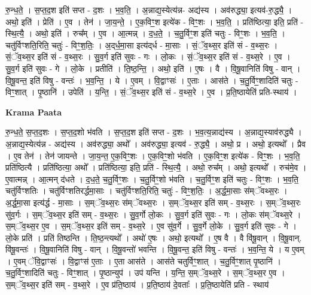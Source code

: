 \documentclass[17pt]{extarticle}
\begin{document}
रु॒न्ध॒ते॒ । स॒प्त॒द॒श इति॑ सप्त - द॒शः । भ॒व॒ति॒ । अ॒न्नाद्य॒स्येत्य॑न्न- अद्य॑स्य । अव॑रुद्ध्या॒ इत्यव॑-रु॒द्ध्यै॒ । अथो॒ इति॑ । प्रेति॑ । ए॒व । तेन॑ । जा॒य॒न्ते॒ । ए॒क॒विꣳ॒॒श इत्ये॑क - विꣳ॒॒शः । भ॒व॒ति॒ । प्रति॑ष्ठित्या॒ इति॒ प्रति॑ - स्थि॒त्यै॒ । अथो॒ इति॑ । रुच᳚म् । ए॒व । आ॒त्मन्न् । द॒ध॒ते॒ । च॒तु॒र्विꣳ॒॒श इति॑ चतुः - विꣳ॒॒शः । भ॒व॒ति॒ । चतु॑र्विꣳशति॒रिति॒ चतुः॑ - विꣳ॒॒श॒तिः॒ । अ॒द्‌र्ध॒मा॒सा इत्य॑द्‌र्ध - मा॒साः । सं॒ॅव॒थ्स॒र इति॑ सं - व॒थ्स॒रः । सं॒ॅव॒थ्स॒र इति॑ सं - व॒थ्स॒रः । सु॒व॒र्ग इति॑ सुवः - गः । लो॒कः । सं॒ॅव॒थ्स॒र इति॑ सं - व॒थ्स॒रे । ए॒व । सु॒व॒र्ग इति॑ सुवः - गे । लो॒के । प्रतीति॑ । ति॒ष्ठ॒न्ति॒ । अथो॒ इति॑ । ए॒षः । वै । वि॒षू॒वानिति॑ विषु - वान् । वि॒षू॒वन्त॒ इति॑ विषु - वन्तः॑ । भ॒व॒न्ति॒ । ये । ए॒वम् । वि॒द्वाꣳसः॑ । ए॒ताः । आस॑ते । च॒तु॒र्विꣳ॒॒शादिति॑ चतुः - विꣳ॒॒शात् । पृ॒ष्ठानि॑ । उपेति॑ । य॒न्ति॒ । सं॒ॅव॒थ्स॒र इति॑ सं - व॒थ्स॒रे । ए॒व । प्र॒ति॒ष्ठायेति॑ प्रति-स्थाय॑ ।  \newline


\textbf{Krama Paata} \newline

रु॒न्ध॒ते॒ स॒प्त॒द॒शः । स॒प्त॒द॒शो भ॑वति । स॒प्त॒द॒श इति॑ सप्त - द॒शः । भ॒व॒त्य॒न्नाद्य॑स्य । अ॒न्नाद्य॒स्याव॑रुद्ध्यै । अ॒न्नाद्य॒स्येत्य॑न्न - अद्य॑स्य । अव॑रुद्ध्या॒ अथो᳚ । अव॑रुद्ध्या॒ इत्यव॑ - रु॒द्ध्यै॒ । अथो॒ प्र । अथो॒ इत्यथो᳚ । प्रैव । ए॒व तेन॑ । तेन॑ जायन्ते । जा॒य॒न्त॒ ए॒क॒विꣳ॒॒शः । ए॒क॒विꣳ॒॒शो भ॑वति । ए॒क॒विꣳ॒॒श इत्ये॑क - विꣳ॒॒शः । भ॒व॒ति॒ प्रति॑ष्ठित्यै । प्रति॑ष्ठित्या॒ अथो᳚ । प्रति॑ष्ठित्या॒ इति॒ प्रति॑ - स्थि॒त्यै॒ । अथो॒ रुच᳚म् । अथो॒ इत्यथो᳚ । रुच॑मे॒व । ए॒वात्मन्न् । आ॒त्मन् द॑धते । द॒ध॒ते॒ च॒तु॒र्विꣳ॒॒शः । च॒तु॒र्विꣳ॒॒शो भ॑वति । 
च॒तु॒र्विꣳ॒॒श इति॑ चतुः - विꣳ॒॒शः । भ॒व॒ति॒ चतु॑र्विꣳशतिः । चतु॑र्विꣳशतिरर्द्धमा॒साः । चतु॑र्विꣳशति॒रिति॒ चतुः॑ - विꣳ॒॒श॒तिः॒ । अ॒र्द्ध॒मा॒साः स॑म्ॅवथ्स॒रः । अ॒र्द्ध॒मा॒सा इत्य॑र्द्ध - मा॒साः । स॒म्ॅव॒थ्स॒रः स॑म्ॅवथ्स॒रः । स॒म्ॅव॒थ्स॒र इति॑ सम् - व॒थ्स॒रः । स॒म्ॅव॒थ्स॒रः सु॑व॒र्गः । स॒म्ॅव॒थ्स॒र इति॑ सम् - व॒थ्स॒रः । सु॒व॒र्गो लो॒कः । सु॒व॒र्ग इति॑ सुवः - गः । लो॒कः स॑म्ॅवथ्स॒रे । स॒म्ॅव॒थ्स॒र ए॒व । स॒म्ॅव॒थ्स॒र इति॑ सम् - व॒थ्स॒रे । ए॒व सु॑व॒र्गे । सु॒व॒र्गे लो॒के । सु॒व॒र्ग इति॑ सुवः - गे । लो॒के प्रति॑ । प्रति॑ तिष्ठन्ति । ति॒ष्ठ॒न्त्यथो᳚ । अथो॑ ए॒षः । अथो॒ इत्यथो᳚ । ए॒ष वै । वै वि॑षू॒वान् । वि॒षू॒वान्. वि॑षू॒वन्तः॑ । वि॒षू॒वानिति॑ विषु - वान् । वि॒षू॒वन्तो॑ भवन्ति । वि॒षू॒वन्त॒ इति॑ विषु - वन्तः॑ । भ॒व॒न्ति॒ ये । य ए॒वम् । ए॒वम् ॅवि॒द्वाꣳसः॑ । वि॒द्वाꣳस॑ ए॒ताः । ए॒ता आस॑ते । आस॑ते चतुर्विꣳ॒॒शात् । च॒तु॒र्विꣳ॒॒शात् पृ॒ष्ठानि॑ । च॒तु॒र्विꣳ॒॒शादिति॑ चतुः - विꣳ॒॒शात् । पृ॒ष्ठान्युप॑ । उप॑ यन्ति । य॒न्ति॒ स॒म्ॅव॒थ्स॒रे । स॒म्ॅव॒थ्स॒र ए॒व । स॒म्ॅव॒थ्स॒र इति॑ सम् - व॒थ्स॒रे । ए॒व प्र॑ति॒ष्ठाय॑ । प्र॒ति॒ष्ठाय॑ दे॒वताः᳚ । प्र॒ति॒ष्ठायेति॑ प्रति - स्थाय॑ \newline
\end{document}
